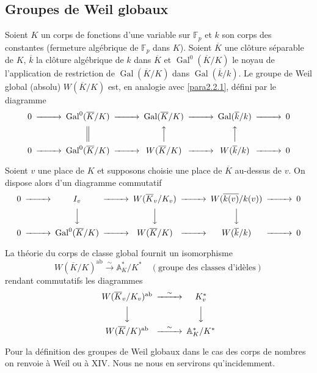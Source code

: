 \documentclass[11pt,a4paper]{amsart}
\theoremstyle{plain}
\theoremstyle{definition}
\DeclareMathOperator{\Gal}{Gal}
\newcommand{\dbA}{\mathbb{A}}
\newcommand{\dbF}{\mathbb{F}}
\newcommand{\ab}{\mathrm{ab}}
\newenvironment{para}{\par\noindent}{\par}
\newcommand{\ov}[1]{\overline{#1}}
\newcommand{\isom}{\xrightarrow{\sim}}
\begin{document}
\subsection{Groupes de Weil globaux}

\begin{para}
Soient $K$ un corps de fonctions d'une variable sur $\dbF_{p}$ et $k$ son corps des constantes (fermeture alg\'ebrique de $\dbF_{p}$ dans $K$). Soient $\ov{K}$ une cl\^oture s\'eparable de $K$, $\ov{k}$ la cl\^oture alg\'ebrique de $k$ dans $\ov{K}$ et $\Gal^{0}(\ov{K}/K)$ le noyau de l'application de restriction de $\Gal(\ov{K}/K)$ dans $\Gal(\ov{k}/k)$. Le groupe de Weil global (absolu) $W(\ov{K}/K)$ est, en analogie avec \ref{para2.2.1}, d\'efini par le diagramme
\[
\begin{CD}
0 @>>> \Gal^{0}(\ov{K}/K) @>>> \Gal(\ov{K}/K) @>>> \Gal(\ov{k}/k) @>>> 0 \\
@. @| @AAA @AAA @. \\
0 @>>> \Gal^{0}(\ov{K}/K) @>>> W(\ov{K}/K) @>>> W(\ov{k}/k) @>>> 0
\end{CD}
\]
\end{para}

\begin{para}
Soient $v$ une place de $K$ et supposons choisie une place de $\ov{K}$ au-dessus de $v$. On dispose alors d'un diagramme commutatif
\[
\begin{CD}
0 @>>> I_{v} @>>> W(\ov{K}_{v}/K_{v}) @>>> W(\ov{k(v)}/k(v)) @>>> 0 \\
@. @VVV @VVV @VVV @. \\
0 @>>> \Gal^{0}(\ov{K}/K) @>>> W(\ov{K}/K) @>>> W(\ov{k}/k) @>>> 0
\end{CD}
\]
\end{para}

\begin{para}
La th\'eorie du corps de classe global fournit un isomorphisme
\[
W(\ov{K}/K)^{\ab} \isom \dbA_{K}^{*}/K^{*} \quad (\text{groupe des classes d'id\`eles})
\]
rendant commutatifs les diagrammes
\[
\begin{CD}
W(\ov{K}_{v}/K_{v})^{\ab} @>{\sim}>> K_{v}^{*} \\
@VVV @VVV \\
W(\ov{K}/K)^{\ab} @>{\sim}>> \dbA_{K}^{*}/K^{*}
\end{CD}
\]
\end{para}

\begin{para}
Pour la d\'efinition des groupes de Weil globaux dans le cas des corps de nombres on renvoie \`a Weil \cite{19} ou \`a \cite{2} XIV. Nous ne nous en servirons qu'incidemment.
\end{para}
\end{document}
